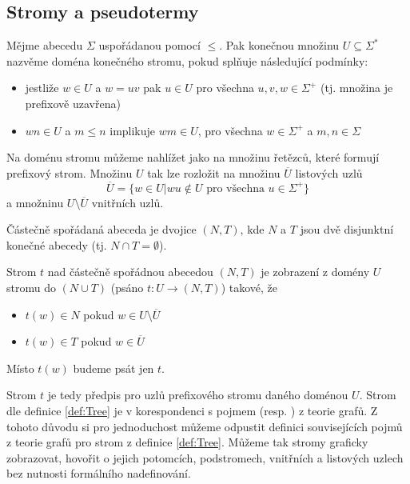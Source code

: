 \documentclass[a4paper,10pt]{article}
\begin{document}
\subsection{Stromy a pseudotermy}

\begin{definition}
  Mějme abecedu $\Sigma$ uspořádanou pomocí $\leq$. Pak konečnou množinu $U \subseteq \Sigma^*$ nazvěme doména konečného stromu, pokud splňuje následující podmínky:
  \begin{itemize}
   \item jestliže $w \in U$ a $w = uv$ pak $u \in U$ pro všechna $u, v, w \in \Sigma^+$ (tj. množina je prefixově uzavřena)
   \item $wn \in U$ a $m \leq n$ implikuje $wm \in U$, pro všechna $w \in \Sigma^+$ a $m, n \in \Sigma$
  \end{itemize}
\end{definition}
 Na doménu stromu můžeme nahlížet jako na množinu řetězců, které formují prefixový strom. Množinu $U$ tak lze rozložit na množinu $\overline{U}$ listových uzlů 
$$
 \overline{U} = \{ w \in U | w u \notin U \text{ pro všechna } u \in \Sigma^+ \}
$$
a množninu $U \setminus \overline{U}$ vnitřních uzlů.

\begin{definition}
  Částečně spořádaná abeceda je dvojice $(N, T)$, kde $N$ a $T$ jsou dvě disjunktní konečné abecedy (tj. $N \cap T = \emptyset$).
\end{definition}

\begin{definition}[Strom] \label{def:Tree}
 Strom $t$ nad částečně spořádnou abecedou $(N, T)$ je zobrazení z domény $U$ stromu do $(N \cup T) $ (psáno $t: U \rightarrow (N, T)$) takové, že
 \begin{itemize}
  \item $t(w) \in N$ pokud $w \in U \setminus \overline{U}$
  \item $t(w) \in T$ pokud $w \in \overline{U}$
 \end{itemize}
 Místo $t(w)$ budeme psát jen $t$.
\end{definition}
Strom $t$ je tedy předpis pro  uzlů prefixového stromu daného doménou $U$. Strom dle definice \ref{def:Tree} je v korespondenci s pojmem  (resp. ) z teorie grafů. Z tohoto důvodu si pro jednoduchost můžeme odpustit definici souvisejících pojmů z teorie grafů pro strom z definice \ref{def:Tree}. Můžeme tak stromy graficky zobrazovat, hovořit o jejich potomcích, podstromech, vnitřních a listových uzlech bez nutnosti formálního nadefinování.
\end{document}
